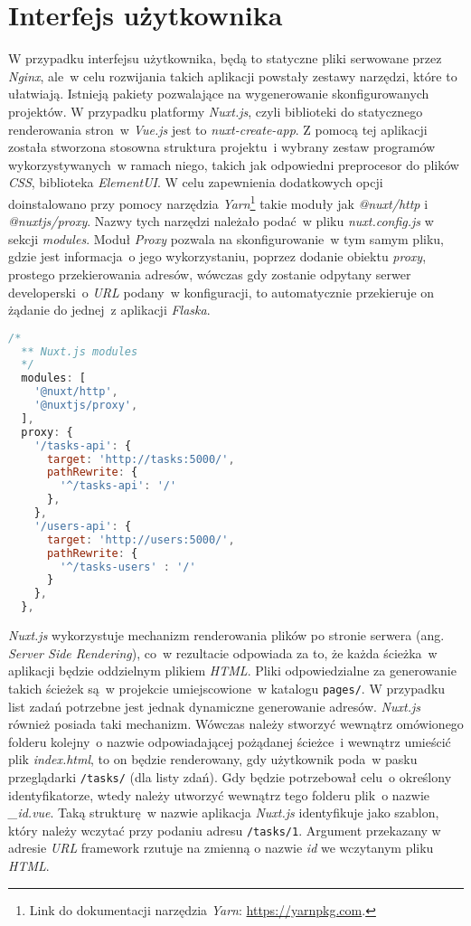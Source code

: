 \section{Interfejs użytkownika}
\label{sec:ui}
W przypadku interfejsu użytkownika, będą to statyczne pliki serwowane przez \textit{Nginx}, ale~w celu rozwijania takich aplikacji powstały zestawy narzędzi, które to ułatwiają. Istnieją pakiety pozwalające na wygenerowanie skonfigurowanych projektów. W przypadku platformy \textit{Nuxt.js}, czyli biblioteki do statycznego renderowania stron~w \textit{Vue.js} jest to \textit{nuxt-create-app}\cite{nuxtjs}. Z pomocą tej aplikacji została stworzona stosowna struktura projektu~i wybrany zestaw programów wykorzystywanych~w ramach niego, takich jak odpowiedni preprocesor do plików \textit{CSS}, biblioteka \textit{ElementUI}. W celu zapewnienia dodatkowych opcji doinstalowano przy pomocy narzędzia \textit{Yarn}\footnote{Link do dokumentacji narzędzia \textit{Yarn}: \url{https://yarnpkg.com}.} takie moduły jak \textit{@nuxt/http} i \textit{@nuxtjs/proxy}. Nazwy tych narzędzi należało podać~w pliku \textit{nuxt.config.js} w sekcji \textit{modules}. Moduł \textit{Proxy} pozwala na skonfigurowanie~w tym samym pliku, gdzie jest informacja~o jego wykorzystaniu, poprzez dodanie obiektu \textit{proxy}, prostego przekierowania adresów, wówczas gdy zostanie odpytany serwer developerski~o \textit{URL} podany~w konfiguracji, to automatycznie przekieruje on żądanie do jednej~z aplikacji \textit{Flaska}.
\begin{lstlisting}[language=Javascript, caption={Fragment pliku \textit{nuxt.config.js} z konfiguracją obiektu \textit{proxy}.}]
  /*
  ** Nuxt.js modules
  */
  modules: [
    '@nuxt/http',
    '@nuxtjs/proxy',
  ],
  proxy: {
    '/tasks-api': {
      target: 'http://tasks:5000/',
      pathRewrite: {
        '^/tasks-api': '/'
      },
    },
    '/users-api': {
      target: 'http://users:5000/',
      pathRewrite: {
        '^/tasks-users' : '/'
      }
    },
  },
\end{lstlisting}

\textit{Nuxt.js} wykorzystuje mechanizm renderowania plików po stronie serwera (ang. \textit{Server Side Rendering}), co~w rezultacie odpowiada za to, że każda ścieżka~w aplikacji będzie oddzielnym plikiem \textit{HTML}\cite{nuxtjs}. Pliki odpowiedzialne za generowanie takich ścieżek są~w projekcie umiejscowione~w katalogu \verb|pages/|. W przypadku list zadań potrzebne jest jednak dynamiczne generowanie adresów. \textit{Nuxt.js} również posiada taki mechanizm\cite{nuxtjs}. Wówczas należy stworzyć wewnątrz omówionego folderu kolejny~o nazwie odpowiadającej pożądanej ścieżce~i wewnątrz umieścić plik \textit{index.html}, to on będzie renderowany, gdy użytkownik poda~w pasku przeglądarki \verb|/tasks/| (dla listy zdań). Gdy będzie potrzebował celu~o określony identyfikatorze, wtedy należy utworzyć wewnątrz tego folderu plik~o nazwie \textit{\_id.vue}. Taką strukturę~w nazwie aplikacja \textit{Nuxt.js} identyfikuje jako szablon, który należy wczytać przy podaniu adresu \verb|/tasks/1|. Argument przekazany w adresie \textit{URL} framework rzutuje na zmienną o nazwie \textit{id} we wczytanym pliku \textit{HTML}\cite{nuxtjs}.

